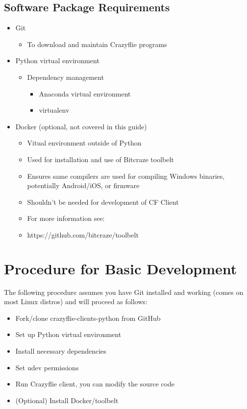 \documentclass[12pt]{article}
\begin{document}
\subsection{Software Package Requirements}
	\begin{itemize}
		\item Git
			\begin{itemize}
				\item To download and maintain Crazyflie programs
			\end{itemize}
		\item Python virtual environment
			\begin{itemize}
				\item Dependency management
			\begin{itemize}
				\item Anaconda virtual environment
				\item virtualenv
			\end{itemize}
			\end{itemize}
		\item Docker (optional, not covered in this guide)
			\begin{itemize}
				\item Vitual environment outside of Python
				\item Used for installation and use of Bitcraze toolbelt
				\item Ensures same compilers are used for compiling Windows binaries, potentially Android/iOS, or firmware
				\item Shouldn't be needed for development of CF Client
				\item For more information see:
				\item https://github.com/bitcraze/toolbelt
			\end{itemize}
	\end{itemize}

\section{Procedure for Basic Development}
The following procedure assumes you have Git installed and working (comes on most Linux distros) and will proceed as follows:
	\begin{itemize}
		\item Fork/clone crazyflie-clients-python from GitHub
		\item Set up Python virtual environment
		\item Install necessary dependencies
		\item Set udev permissions
		\item Run Crazyflie client, you can modify the source code
		\item (Optional) Install Docker/toolbelt
	\end{itemize}
\end{document}
